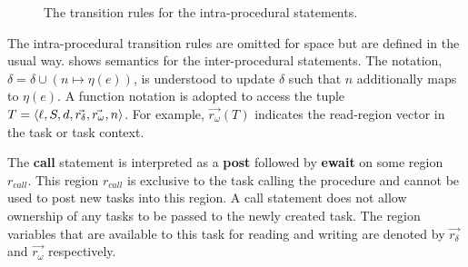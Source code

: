 \begin{figure}
\begin{center}
  \end{center}
  \caption{The transition rules for the intra-procedural statements.}
  \label{fig:inter}
    \label{fig:semantics}
\end{figure}

The intra-procedural transition rules are omitted for space but are defined in the usual way.  shows semantics for the inter-procedural statements. The notation, $\delta = \delta \cup (n \mapsto \eta(e))$, is understood to update $\delta$ such that $n$ additionally maps to $\eta(e)$. A function notation is adopted to access the tuple $T = \langle \ell,  S, d, \vec{r_\delta}, \vec{r_\omega}, n \rangle $. For example, $\vec{r_\omega}(T)$ indicates the read-region vector in the task or task context.

The \textbf{call} statement is interpreted as a \textbf{post} followed by \textbf{ewait} on some region $r_{call}$. This region $r_{call}$ is exclusive to the task calling the procedure and cannot be used to post new tasks into this region. A call statement does not allow ownership of any tasks to be passed to the newly created task. The region variables that are available to this task for reading and writing are denoted by $\vec{r_\delta}$ and $\vec{r_\omega}$ respectively.

